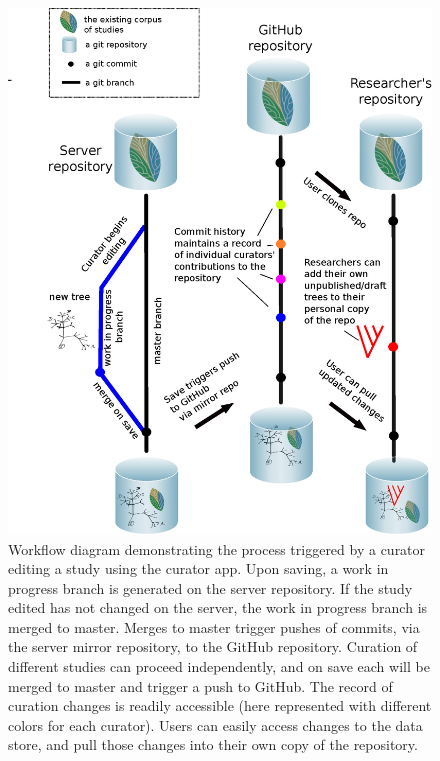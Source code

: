\begin{figure}
\includegraphics[scale=0.4]{workflow.eps}
 \caption{Workflow diagram demonstrating the process triggered by a curator editing a study using the curator app.
 Upon saving, a work in progress branch is generated on the server repository. 
 If the study edited has not changed on the server, the work in progress branch is merged to master.
 Merges to master trigger pushes of commits, 
 via the server mirror repository, to the \otol GitHub repository.
 Curation of different studies can proceed independently, and on save each will be merged to master and trigger a push to GitHub.
 The record of curation changes is readily accessible (here represented with different colors for each curator).
 Users can easily access changes to the data store, and pull those changes into their own copy of the repository.
 }
\label{workflow}
\end{figure}

